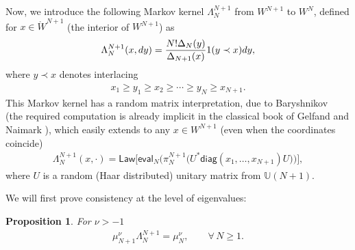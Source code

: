\documentclass[11pt]{article}
\numberwithin{equation}{section}
\newtheorem{Proposition}[Theorem]{Proposition}
{ \theoremstyle{definition}
\newtheorem{Definition}[Theorem]{Definition}
\newtheorem{Remark}[Theorem]{Remark} }
\begin{document}
Now, we introduce the following Markov kernel $\Lambda_N^{N+1}$ from $W^{N+1}$ to $W^N$, defined for \mbox{$x \in \mathring{W}^{N+1}$} (the interior of $W^{N+1}$) as
\begin{gather*}
\Lambda_N^{N+1}(x,{\rm d}y)=\frac{N!\Delta_N(y)}{\Delta_{N+1}(x)}\textbf{1}(y\prec x){\rm d}y,
\end{gather*}
where $y\prec x$ denotes interlacing
\begin{gather*}
x_1 \ge y_1 \ge x_2 \ge \cdots \ge y_N \ge x_{N+1}.
\end{gather*}
This Markov kernel has a random matrix interpretation, due to Baryshnikov~\cite{Baryshnikov} (the required computation is already implicit in the classical book of Gelfand and Naimark \cite{GelfandNaimark}), which easily extends to any $x\in W^{N+1}$ (even when the coordinates coincide)
\begin{gather*}
\Lambda_N^{N+1}(x,\cdot)=\mathsf{Law} \big[\mathsf{eval}_N \big(\pi_N^{N+1}\big(U^*\mathsf{diag}(x_1,\dots, x_{N+1})U\big)\big)\big],
\end{gather*}
where $U$ is a random (Haar distributed) unitary matrix from $\mathbb{U}(N+1)$.

We will first prove consistency at the level of eigenvalues:

\begin{Proposition}\label{eigenvalueconsistency}
For $\nu>-1$
\begin{gather*}
\mu_{N+1}^{\nu} \Lambda_N^{N+1}=\mu_N^{\nu}, \qquad \forall\, N\ge 1.
\end{gather*}
\end{Proposition}
\end{document}
